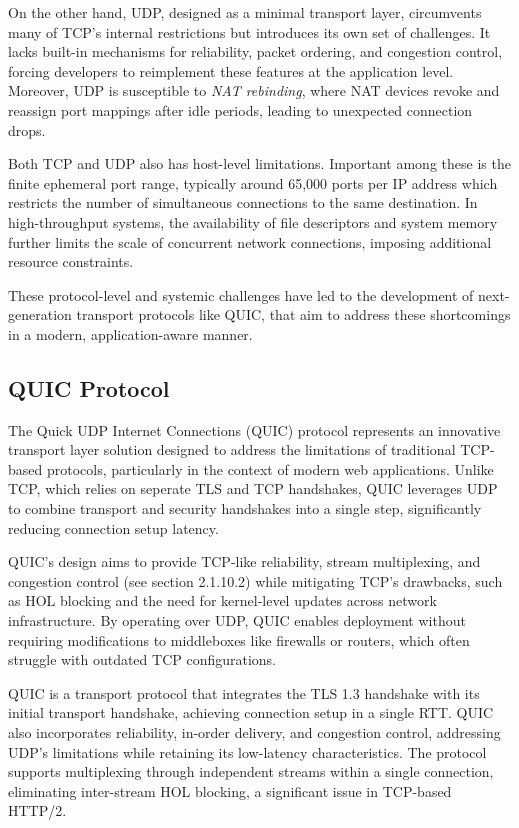 On the other hand, UDP, designed as a minimal transport layer, circumvents many of TCP’s internal restrictions but introduces its own set of challenges. It lacks built-in mechanisms for reliability, packet ordering, and congestion control, forcing developers to reimplement these features at the application level. Moreover, UDP is susceptible to \textit{NAT rebinding}, where NAT devices revoke and reassign port mappings after idle periods, leading to unexpected connection drops.

Both TCP and UDP also has  host-level limitations. Important among these is the finite ephemeral port range, typically around 65,000 ports per IP address which restricts the number of simultaneous connections to the same destination. In high-throughput systems, the availability of file descriptors and system memory further limits the scale of concurrent network connections, imposing additional resource constraints.

These protocol-level and systemic challenges have led to the development of next-generation transport protocols like QUIC, that aim to address these shortcomings in a modern, application-aware manner.

\subsection{QUIC Protocol}

The Quick UDP Internet Connections (QUIC) protocol represents an innovative transport layer solution designed to address the limitations of traditional TCP-based protocols, particularly in the context of modern web applications. Unlike TCP, which relies on seperate TLS and TCP handshakes, QUIC leverages UDP to combine transport and security handshakes into a single step, significantly reducing connection setup latency.

QUIC’s design aims to provide TCP-like reliability, stream multiplexing, and congestion control (see section 2.1.10.2) while mitigating TCP’s drawbacks, such as HOL blocking and the need for kernel-level updates across network infrastructure. By operating over UDP, QUIC enables deployment without requiring modifications to middleboxes like firewalls or routers, which often struggle with outdated TCP configurations. 

QUIC is a transport protocol that integrates the TLS 1.3 handshake with its initial transport handshake, achieving connection setup in a single RTT. QUIC also incorporates reliability, in-order delivery, and congestion control, addressing UDP’s limitations while retaining its low-latency characteristics. The protocol supports multiplexing through independent streams within a single connection, eliminating inter-stream HOL blocking, a significant issue in TCP-based HTTP/2. 


